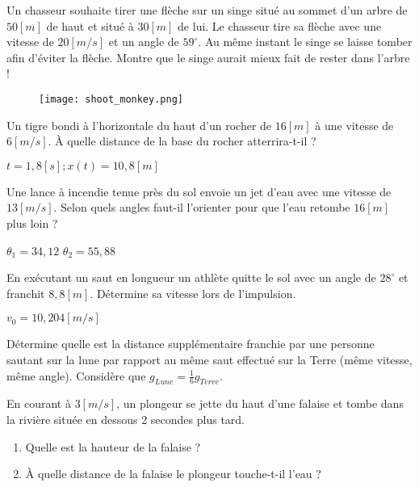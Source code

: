 \begin{exercise}
    Un chasseur souhaite tirer une flèche sur un singe situé au sommet d'un arbre de \(50[m]\) de haut et situé à \(30[m]\) de lui. Le chasseur tire sa flèche avec une vitesse de \(20\unit{[m/s]}\) et un angle de \(59^{\circ}\). Au même instant le singe se laisse tomber afin d'éviter la flèche. Montre que le singe aurait mieux fait de rester dans l'arbre !
    \begin{figure}[h!]
        \centering
        \texttt{[image: shoot\_monkey.png]}
    \end{figure}
\end{exercise}


\begin{exercise}
    Un tigre bondi à l'horizontale du haut d'un rocher de \(16[m]\) à une vitesse de \(6\unit{[m/s]}\). À quelle distance de la base du rocher atterrira-t-il ?
\end{exercise}
\begin{solution}
    \(t=1,8[s] ; x(t)=10,8[m]\)
\end{solution}

\begin{exercise}
    Une lance à incendie tenue près du sol envoie un jet d'eau avec une vitesse de \(13\unit{[m/s]}\). Selon quels angles faut-il l'orienter pour que l'eau retombe \(16[m]\) plus loin ?
\end{exercise}
\begin{solution}
    \(\theta _1 = 34,12 \)
    \(\theta _2 = 55,88 \)
\end{solution}


\begin{exercise}
    En exécutant un saut en longueur un athlète quitte le sol avec un angle de \(28^{\circ}\) et franchit \(8,8[m]\). Détermine sa vitesse lors de l'impulsion.
\end{exercise}
\begin{solution}
    \(v_0=10,204\unit{[m/s]} \)
\end{solution}


\begin{exercise}
    Détermine quelle est la distance supplémentaire franchie par une personne sautant sur la lune par rapport au même saut effectué sur la Terre (même vitesse, même angle). Considère que \(g_{Lune}=\frac{1}{6} g_{Terre}\).
\end{exercise}


\begin{exercise}
    En courant à \(3\unit{[m/s]}\), un plongeur se jette du haut d'une falaise et tombe dans la rivière située en dessous 2 secondes plus tard.
    \begin{enumerate}[label=\alph*)]
        \item Quelle est la hauteur de la falaise ?
        \item À quelle distance de la falaise le plongeur touche-t-il l'eau ?
    \end{enumerate}
\end{exercise}